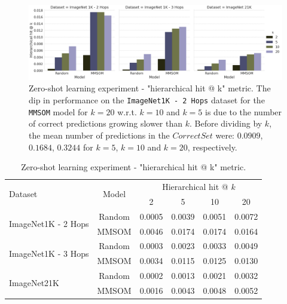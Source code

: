 \documentclass[a4paper]{standalone}
\begin{document}
\begin{figure}[h]
    \centering
    \includegraphics[width=\textwidth]{images/zero_shot_h_results.png}
    \caption{Zero-shot learning experiment - "hierarchical hit @ k" metric. The dip in performance on the \texttt{ImageNet1K - 2 Hops} dataset for the \texttt{MMSOM} model for $k=20$ w.r.t. $k=10$ and $k=5$ is due to the number of correct predictions growing slower than $k$. Before dividing by $k$, the mean number of predictions in the $CorrectSet$ were: $0.0909$, $0.1684$, $0.3244$ for $k=5$, $k=10$ and $k=20$, respectively.}
    \label{ZeroShotHierarchicalResults}
\end{figure}

\begin{table}[h]
    \centering
    \begin{footnotesize}
        \begin{tabularx}{\textwidth}{|X|c|c|c|c|c|}
            \hline
            \multirow{2}{*}{Dataset} & \multirow{2}{*}{Model}    & \multicolumn{4}{c|}{Hierarchical hit @ $k$}        \\
            \cline{3-6}              &                           & 2      & 5      & 10     & 20     \\ 
            \hline
            \hline
            \multirow{2}{*}{ImageNet1K - 2 Hops} & Random        & 0.0005 & 0.0039 & 0.0051 & 0.0072 \\ 
            \cline{2-6}                          & MMSOM         & 0.0046 & 0.0174 & 0.0174 & 0.0164 \\ 
            \hline
            \hline
            \multirow{2}{*}{ImageNet1K - 3 Hops} & Random        & 0.0003 & 0.0023 & 0.0033 & 0.0049 \\ 
            \cline{2-6}                          & MMSOM         & 0.0034 & 0.0115 & 0.0125 & 0.0130 \\ 
            \hline
            \hline
            \multirow{2}{*}{ImageNet21K}         & Random        & 0.0002 & 0.0013 & 0.0021 & 0.0032 \\ 
            \cline{2-6}                          & MMSOM         & 0.0016 & 0.0043 & 0.0048 & 0.0052 \\ 
            \hline
        \end{tabularx}
    \end{footnotesize}
    \caption{Zero-shot learning experiment - "hierarchical hit @ k" metric.}
    \label{tab:ZeroShotHierarchicalResults}
\end{table}
\end{document}
